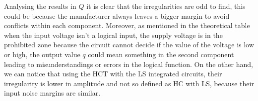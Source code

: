     \pagebreak

	Analysing the results in $Q$ it is clear that the irregularities are odd to find, this could be because the manufacturer always leaves a bigger margin to avoid conflicts within each component. Moreover, as mentioned in the theoretical table when the input voltage isn't a logical input, the supply voltage is in the prohibited zone because the circuit cannot decide if the value of the voltage is low or high, the output value $q$ could mean something in the second component leading to misunderstandings or errors in the logical function. On the other hand, we can notice that using the HCT with the LS integrated circuits, their irregularity is lower in amplitude and not so defined as HC with LS, because their input noise margins are similar. 

%